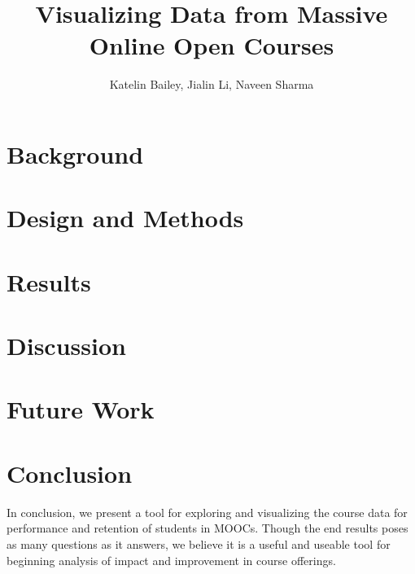 \documentclass[journal]{vgtc}                %
\title{Visualizing Data from Massive Online Open Courses}
\author{Katelin Bailey, Jialin Li, Naveen Sharma}
\begin{document}
\maketitle

	
\section{Background}
	
\section{Design and Methods}
	
\section{Results}
	
\section{Discussion}
	
\section{Future Work}
	
\section{Conclusion}
	In conclusion, we present a tool for exploring and visualizing the course data for performance and retention of students in MOOCs. Though the end results poses as many questions as it answers, we believe it is a useful and useable tool for beginning analysis of impact and improvement in course offerings. 


%
%
%



%


\end{document}
